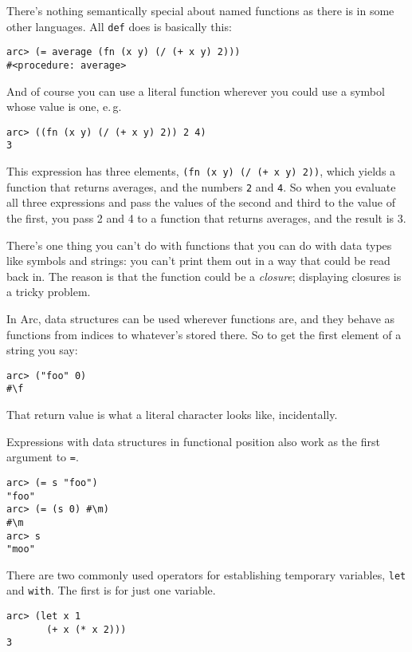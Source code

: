 \documentclass[a4paper,12pt]{book}
\begin{document}
There's nothing semantically special about named functions as there
is in some other languages.  All \verb|def| does is basically this:

\begin{verbatim}
arc> (= average (fn (x y) (/ (+ x y) 2)))
#<procedure: average>
\end{verbatim}

And of course you can use a literal function wherever you could use
a symbol whose value is one, e.\,g.

\begin{verbatim}
arc> ((fn (x y) (/ (+ x y) 2)) 2 4)
3
\end{verbatim}

This expression has three elements, \verb|(fn (x y) (/ (+ x y) 2))|, which
yields a function that returns averages, and the numbers {\tt2} and {\tt4}.
So when you evaluate all three expressions and pass the values of
the second and third to the value of the first, you pass 2 and 4
to a function that returns averages, and the result is 3.

There's one thing you can't do with functions that you can do with
data types like symbols and strings: you can't print them out in a
way that could be read back in.  The reason is that the function 
could be a {\em{}closure}; displaying closures is a tricky problem.

In {\sc{}Arc}, data structures can be used wherever functions are, and
they behave as functions from indices to whatever's stored there.
So to get the first element of a string you say:

\begin{verbatim}
arc> ("foo" 0)
#\f
\end{verbatim}

That return value is what a literal character looks like, incidentally.

Expressions with data structures in functional position also work
as the first argument to {\tt=}.

\begin{verbatim}
arc> (= s "foo")
"foo"
arc> (= (s 0) #\m)
#\m
arc> s
"moo"
\end{verbatim}

There are two commonly used operators for establishing temporary
variables, \verb|let| and \verb|with|.  The first is for just one variable.

\begin{verbatim}
arc> (let x 1 
       (+ x (* x 2)))
3
\end{verbatim}
\end{document}
